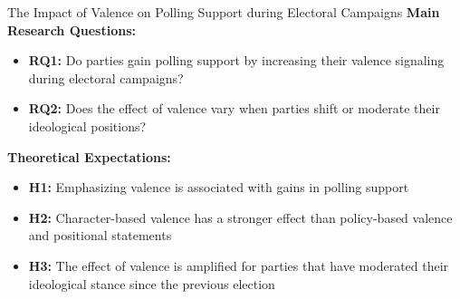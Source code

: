 \documentclass[9pt, aspectratio=169]{beamer}
\newcommand{\customcites}[1]{\textcolor{blue}{\footnotesize\parencites{#1}}}
\begin{document}
\begin{frame}{The Impact of Valence on Polling Support during Electoral Campaigns}
    \textbf{Main Research Questions:}     \vspace{0.2cm}
    \begin{itemize}
        \item \textbf{RQ1:} Do parties gain polling support by increasing their valence signaling during electoral campaigns?\vspace{0.2cm}
        \item \textbf{RQ2:} Does the effect of valence vary when parties shift or moderate their ideological positions?\vspace{0.2cm}
    \end{itemize}
\vspace{0.3cm}
    \textbf{Theoretical Expectations:} \vspace{0.2cm}
    \begin{itemize}
        \item \textbf{H1:} Emphasizing valence is associated with gains in polling support \customcites{adams2011anybody, abney2013valence}\vspace{0.2cm}
        \item \textbf{H2:} Character-based valence has a stronger effect than policy-based valence and positional statements \customcites{clark2009valence, Lenz2012}\vspace{0.2cm}
        \item \textbf{H3:} The effect of valence is amplified for parties that have moderated their ideological stance since the previous election
    \end{itemize}
\end{frame}
\end{document}
